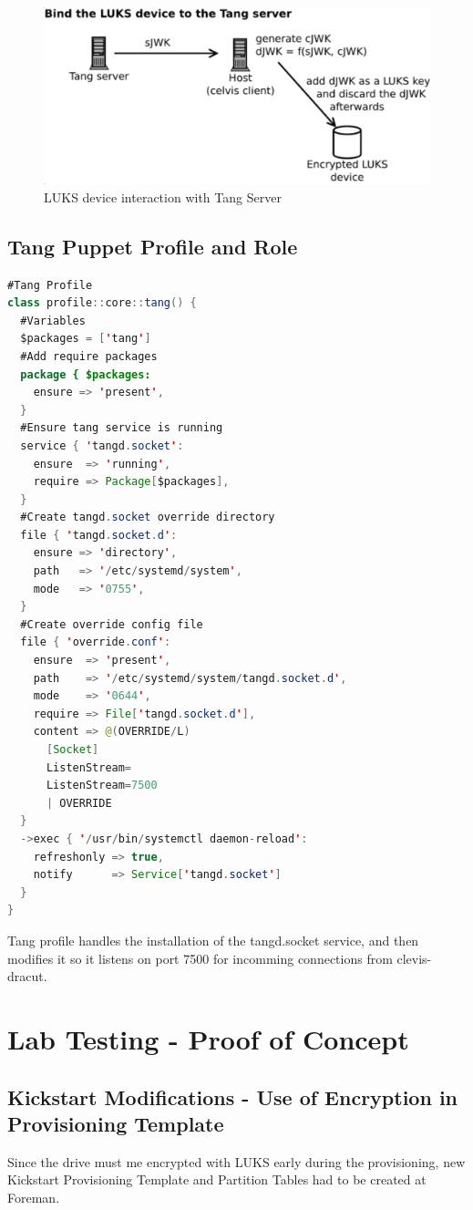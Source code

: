 \vskip 2cm
\begin{figure}
  \includegraphics[width=14cm]{images/image3.png}
  \centering
  \caption{LUKS device interaction with Tang Server}
\end{figure}

\newpage
\subsection{Tang Puppet Profile and Role}

\begin{lstlisting}[language=Java]
#Tang Profile
class profile::core::tang() {
  #Variables
  $packages = ['tang']
  #Add require packages
  package { $packages:
    ensure => 'present',
  }
  #Ensure tang service is running
  service { 'tangd.socket':
    ensure  => 'running',
    require => Package[$packages],
  }
  #Create tangd.socket override directory
  file { 'tangd.socket.d':
    ensure => 'directory',
    path   => '/etc/systemd/system',
    mode   => '0755',
  }
  #Create override config file
  file { 'override.conf':
    ensure  => 'present',
    path    => '/etc/systemd/system/tangd.socket.d',
    mode    => '0644',
    require => File['tangd.socket.d'],
    content => @(OVERRIDE/L)
      [Socket]
      ListenStream=
      ListenStream=7500
      | OVERRIDE
  }
  ->exec { '/usr/bin/systemctl daemon-reload':
    refreshonly => true,
    notify      => Service['tangd.socket']
  }
}
\end{lstlisting}

Tang profile handles the installation of the tangd.socket service, and then modifies it so it listens on port 7500 for incomming connections from clevis-dracut.

\newpage
\section{Lab Testing - Proof of Concept}
\subsection{Kickstart Modifications - Use of Encryption in Provisioning Template}
Since the drive must me encrypted with LUKS early during the provisioning, new Kickstart Provisioning Template and Partition Tables had to be created at Foreman.

